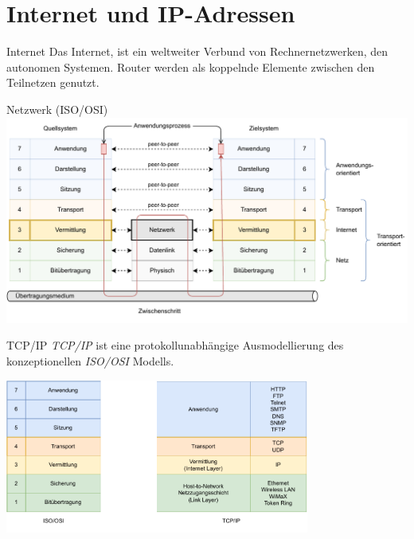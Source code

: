 \section{Internet und IP-Adressen}

\begin{defi}{Internet}
    Das Internet, ist ein weltweiter Verbund von Rechnernetzwerken, den autonomen Systemen.
    Router werden als koppelnde Elemente zwischen den Teilnetzen genutzt.
\end{defi}

\begin{defi}{Netzwerk (ISO/OSI)}
    \includegraphics[width=\textwidth]{includes/figures/defi_iso_osi_network.pdf}
\end{defi}

\begin{defi}{TCP/IP}
    \emph{TCP/IP} ist eine protokollunabhängige Ausmodellierung des konzeptionellen \emph{ISO/OSI} Modells.

    \begin{center}
        \includegraphics[width=0.75\textwidth]{includes/figures/defi_tcp_ip.pdf}
    \end{center}
\end{defi}


